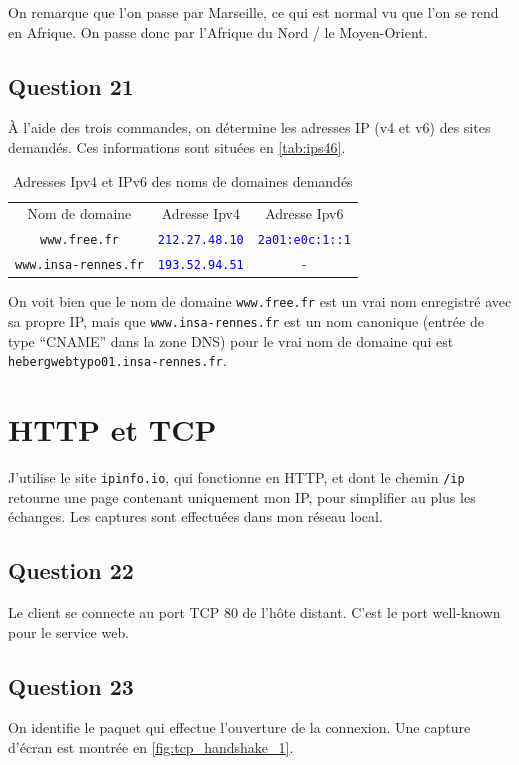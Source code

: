 \documentclass[a4paper,10pt]{article}
\newcommand{\blackword}[1]{\texttt{#1}}
\newcommand{\blueword}[1]{\texttt{\textcolor{blue}{#1}}}
\begin{document}
On remarque que l'on passe par Marseille, ce qui est normal vu que l'on se rend en Afrique. On passe donc par l'Afrique du Nord / le Moyen-Orient.

\subsection{Question 21}

À l'aide des trois commandes, on détermine les adresses IP (v4 et v6) des sites demandés. Ces informations sont situées en \autoref{tab:ips46}.

\begin{table}[ht]
	\centering
	\begin{tabular}{|c|c|c|}
		\bottomrule
		Nom de domaine & Adresse Ipv4 & Adresse Ipv6\\
		\blackword{www.free.fr} & \blueword{212.27.48.10} & \blueword{2a01:e0c:1::1}\\
		\blackword{www.insa-rennes.fr} & \blueword{193.52.94.51} & -\\
		\toprule
	\end{tabular}
	\caption{Adresses Ipv4 et IPv6 des noms de domaines demandés}
	\label{tab:ips46}
\end{table}

On voit bien que le nom de domaine \blackword{www.free.fr} est un vrai nom enregistré avec sa propre IP, mais que \blackword{www.insa-rennes.fr} est un nom canonique (entrée de type ``CNAME'' dans la zone DNS) pour le vrai nom de domaine qui est \blackword{hebergwebtypo01.insa-rennes.fr}.

\pagebreak
\section{HTTP et TCP}

J'utilise le site \blackword{ipinfo.io}, qui fonctionne en HTTP, et dont le chemin \blackword{/ip} retourne une page contenant uniquement mon IP, pour simplifier au plus les échanges. Les captures sont effectuées dans mon réseau local.

\subsection{Question 22}
Le client se connecte au port TCP 80 de l'hôte distant. C'est le port well-known pour le service web.

\subsection{Question 23}
On identifie le paquet qui effectue l'ouverture de la connexion. Une capture d'écran est montrée en \autoref{fig:tcp_handshake_1}.
\end{document}
